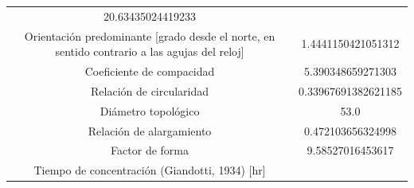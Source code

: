 \documentclass[11pt,]{article}
\begin{document}
\begin{longtable}[]{@{}cc@{}}
\begin{minipage}[t]{0.19\columnwidth}
20.63435024419233\strut
\end{minipage}\tabularnewline
\begin{minipage}[t]{0.75\columnwidth}\centering\strut
Orientación predominante {[}grado desde el norte, en sentido contrario a
las agujas del reloj{]}\strut
\end{minipage} & \begin{minipage}[t]{0.19\columnwidth}\centering\strut
1.4441150421051312\strut
\end{minipage}\tabularnewline
\begin{minipage}[t]{0.75\columnwidth}\centering\strut
Coeficiente de compacidad\strut
\end{minipage} & \begin{minipage}[t]{0.19\columnwidth}\centering\strut
5.390348659271303\strut
\end{minipage}\tabularnewline
\begin{minipage}[t]{0.75\columnwidth}\centering\strut
Relación de circularidad\strut
\end{minipage} & \begin{minipage}[t]{0.19\columnwidth}\centering\strut
0.33967691382621185\strut
\end{minipage}\tabularnewline
\begin{minipage}[t]{0.75\columnwidth}\centering\strut
Diámetro topológico\strut
\end{minipage} & \begin{minipage}[t]{0.19\columnwidth}\centering\strut
53.0\strut
\end{minipage}\tabularnewline
\begin{minipage}[t]{0.75\columnwidth}\centering\strut
Relación de alargamiento\strut
\end{minipage} & \begin{minipage}[t]{0.19\columnwidth}\centering\strut
0.472103656324998\strut
\end{minipage}\tabularnewline
\begin{minipage}[t]{0.75\columnwidth}\centering\strut
Factor de forma\strut
\end{minipage} & \begin{minipage}[t]{0.19\columnwidth}\centering\strut
9.58527016453617\strut
\end{minipage}\tabularnewline
\begin{minipage}[t]{0.75\columnwidth}\centering\strut
Tiempo de concentración (Giandotti, 1934) {[}hr{]}\strut
\end{minipage} & \begin{minipage}[t]{0.19\columnwidth}\centering\strut

\end{minipage}
\end{longtable}
\end{document}
